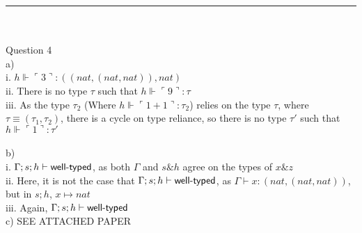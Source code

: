 \documentclass[11pt,a4paper]{article}
\newcommand{\ad}[1]{\ulcorner {#1} \urcorner}
\newcommand{\typ}{\tau} %
\newcommand{\hptyp}[3]{#1 \Vdash #2 : #3}
\newcommand{\tcompat}[3]{#1 ; #2 ; #3 \vdash \textsf{\textup{well-typed}}}
\newcommand{\etyp}[3]{#1 \vdash #2 : #3}
\begin{document}
\rule{\linewidth}{0.4pt} \\ \\
Question 4 \\
\indent a) \\
\indent i. $ \hptyp{h}{\ad{3}}{((nat, (nat, nat)), nat)} $ \\
\indent ii. There is no type $\typ$ such that $\hptyp{h}{\ad{9}}{\typ}$ \\
\indent iii. As the type $\typ_2$ (Where $\hptyp{h}{\ad{1 + 1}}{\typ_2}$) relies on the type $\typ$, where $\typ \equiv (\typ_1, \typ_2)$, there is a cycle on type reliance, so there is no type $\typ'$ such that $\hptyp{h}{\ad{1}}{\typ'}$ \\ \\
\indent b) \\
\indent i. $\tcompat{\Gamma}{s}{h}$, as both $\Gamma$ and $s \& h$ agree on the types of $x \& z$ \\
\indent ii. Here, it is not the case that $\tcompat{\Gamma}{s}{h}$, as $\etyp{\Gamma}{x}{(nat,(nat, nat))}$, but in $s;h$, $x \mapsto nat$ \\
\indent iii. Again, $\tcompat{\Gamma}{s}{h}$ \\
\indent c) SEE ATTACHED PAPER
\end{document}
